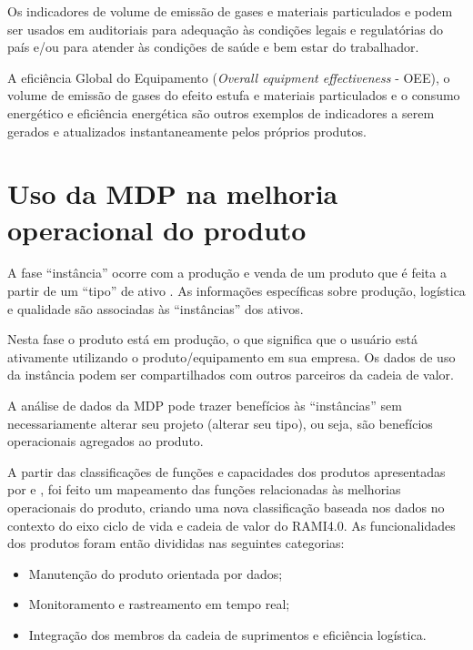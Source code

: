 	Os indicadores de  volume de emissão de gases e materiais particulados e podem ser usados em auditoriais para adequação às condições legais e regulatórias do país e/ou para atender às condições de saúde e bem estar do trabalhador.
	
	A eficiência Global do Equipamento (\textit{Overall equipment effectiveness} - OEE), o volume de emissão de gases do efeito estufa e materiais particulados e o consumo energético e eficiência energética são outros exemplos de indicadores a serem gerados e atualizados instantaneamente pelos próprios produtos.

\section{Uso da MDP na melhoria operacional do produto}

	A fase ``instância'' ocorre com a produção e venda de um produto que é feita a partir de um ``tipo'' de ativo \cite{bader2019aas}. As informações específicas sobre produção, logística e qualidade são associadas às ``instâncias'' dos ativos.
	
	Nesta fase o produto está em produção, o que significa que o usuário está ativamente utilizando o produto/equipamento em sua empresa. Os dados de uso da instância podem ser compartilhados com outros parceiros da cadeia de valor.
	
	A análise de dados da MDP pode trazer benefícios às ``instâncias'' sem necessariamente alterar seu projeto (alterar seu tipo), ou seja, são benefícios operacionais agregados ao produto. 
	
	A partir das classificações de funções e capacidades dos produtos apresentadas por  e , foi feito um mapeamento das funções relacionadas às melhorias operacionais do produto, criando uma nova classificação baseada nos dados no contexto do eixo ciclo de vida e cadeia de valor do RAMI4.0. As funcionalidades dos produtos foram então divididas nas seguintes categorias:	

	\begin{itemize}
		\item Manutenção do produto orientada por dados;
		\item Monitoramento e rastreamento em tempo real;
		\item Integração dos membros da cadeia de suprimentos e eficiência logística.
		
	\end{itemize}

